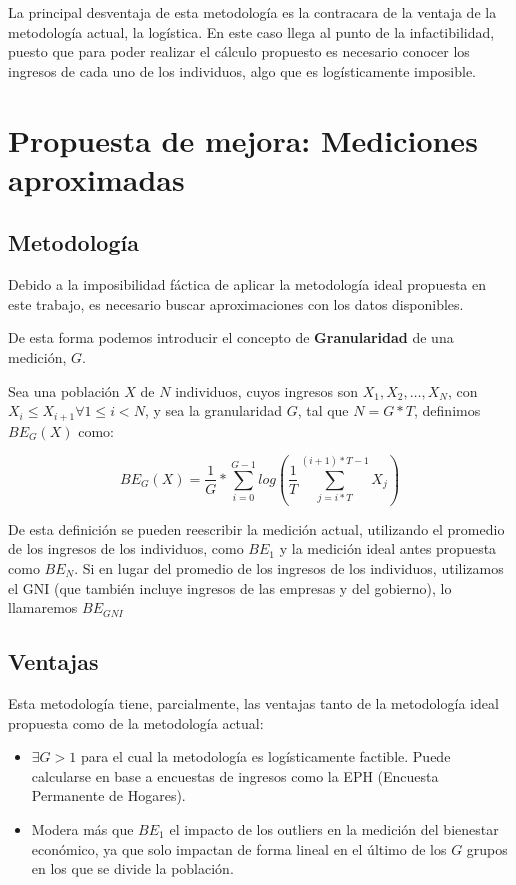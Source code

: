 La principal desventaja de esta metodología es la contracara de la ventaja de la metodología actual, la logística. En este caso llega al punto de la infactibilidad, puesto que para poder realizar el cálculo propuesto es necesario conocer los ingresos de cada uno de los individuos, algo que es logísticamente imposible.

\section{Propuesta de mejora: Mediciones aproximadas}

\subsection{Metodología}

Debido a la imposibilidad fáctica de aplicar la metodología ideal propuesta en este trabajo, es necesario buscar aproximaciones con los datos disponibles.

De esta forma podemos introducir el concepto de \textbf{Granularidad} de una medición, $G$.

Sea una población $X$ de $N$ individuos, cuyos ingresos son $X_1, X_2, \dots, X_N $, con $X_i \leq X_{i+1} \forall 1 \leq i < N$, y sea la granularidad $G$, tal que $N = G * T$, definimos $BE_G(X)$ como:

$$
    BE_G(X) = \frac{1}{G} * \sum_{i=0}^{G-1}log(\frac{1}{T} \sum_{j=i*T}^{(i+1)*T-1}X_j)
$$

De esta definición se pueden reescribir la medición actual, utilizando el promedio de los ingresos de los individuos, como $BE_1$ y la medición ideal antes propuesta como $BE_N$. Si en lugar del promedio de los ingresos de los individuos, utilizamos el GNI (que también incluye ingresos de las empresas y del gobierno), lo llamaremos $BE_{GNI}$

\subsection{Ventajas}

Esta metodología tiene, parcialmente, las ventajas tanto de la metodología ideal propuesta como de la metodología actual:

\begin{itemize}
    \item $\exists G>1$ para el cual la metodología es logísticamente factible. Puede calcularse en base a encuestas de ingresos como la EPH (Encuesta Permanente de Hogares).
    \item Modera más que $BE_1$ el impacto de los outliers en la medición del bienestar económico, ya que solo impactan de forma lineal en el último de los $G$ grupos en los que se divide la población.
\end{itemize}

